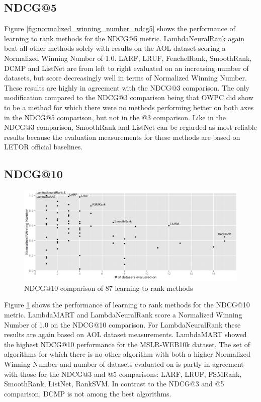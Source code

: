\documentclass{sig-alternate}
\begin{document}
\subsection{NDCG@5}
Figure \ref{fig:normalized_winning_number_ndcg5} shows the performance of learning to rank methods for the NDCG@5 metric. LambdaNeuralRank again beat all other methods solely with results on the AOL dataset scoring a Normalized Winning Number of 1.0. LARF, LRUF, FenchelRank, SmoothRank, DCMP and ListNet are from left to right evaluated on an increasing number of datasets, but score decreasingly well in terms of Normalized Winning Number. These results are highly in agreement with the NDCG@3 comparison. The only modification compared to the NDCG@3 comparison being that OWPC did show to be a method for which there were no methods performing better on both axes in the NDCG@5 comparison, but not in the @3 comparison. Like in the NDCG@3 comparison, SmoothRank and ListNet can be regarded as most reliable results because the evaluation measurements for these methods are based on LETOR official baselines.

\subsection{NDCG@10}
\begin{figure}
\includegraphics[scale=0.371]{gfx/ndcg10_winnum}
\caption{NDCG@10 comparison of 87 learning to rank methods}
\label{fig:normalized_winning_number_ndcg10}
\end{figure}

Figure \ref{fig:normalized_winning_number_ndcg10} shows the performance of learning to rank methods for the NDCG@10 metric. LambdaMART and LambdaNeuralRank score a Normalized Winning Number of 1.0 on the NDCG@10 comparison. For LambdaNeuralRank these results are again based on AOL dataset measurements. LambdaMART showed the highest NDCG@10 performance for the MSLR-WEB10k dataset. The set of algorithms for which there is no other algorithm with both a higher Normalized Winning Number and number of datasets evaluated on is partly in agreement with those for the NDCG@3 and @5 comparisons: {LARF, LRUF, FSMRank, SmoothRank, ListNet, RankSVM}. In contrast to the NDCG@3 and @5 comparison, DCMP is not among the best algorithms.
\end{document}
